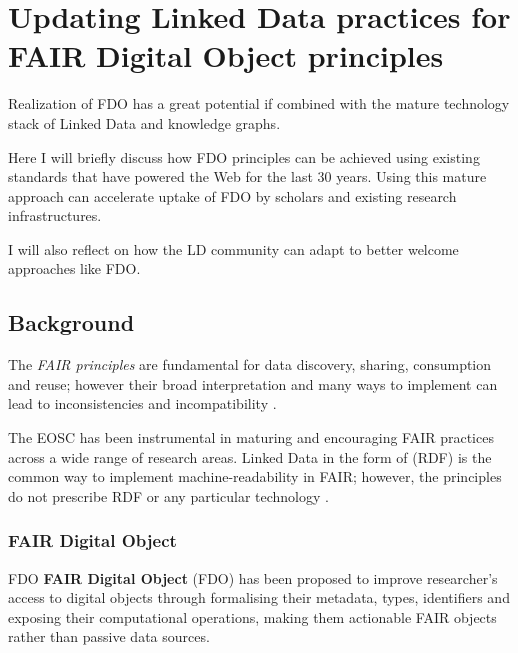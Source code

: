 \section{Updating Linked Data practices for FAIR Digital Object principles}
\label{ch2:updating-linked-data-practices-for-fair-digital-object-principles}

Realization of \acrfull{FDO}
has a great potential if combined with the mature technology stack of Linked Data and knowledge graphs.

Here I will briefly discuss how FDO principles can be achieved using existing standards that have powered the Web for the last 30 years. Using this mature approach can accelerate uptake of FDO by scholars and existing research infrastructures.

I will also reflect on how the \acrfull{LD}
community can adapt to better welcome approaches like FDO.

\subsection{Background}
\label{ch2:background}

The \emph{FAIR principles} \cite{Wilkinson 2016} are
fundamental for data discovery, sharing, consumption and reuse; however
their broad interpretation and many ways to implement can lead to
inconsistencies and incompatibility
\cite{Jacobsen 2020}.

The 
\acrfull{EOSC}
has
been instrumental in maturing and encouraging FAIR practices across a
wide range of research areas. Linked Data in the form of
 (\acrfull{RDF}) is the common way to implement machine-readability in FAIR;
however, the principles do not prescribe RDF or any particular technology
\cite{Mons 2017}.

\subsubsection{FAIR Digital Object}
\label{ch2:fair-digital-object}

\acrfull{FDO}
\textbf{FAIR Digital Object} (FDO)
\cite{Schultes 2019}
has been proposed to improve researcher's access to digital objects
through formalising their metadata, types, identifiers and exposing
their computational operations, making them actionable FAIR objects
rather than passive data sources.

